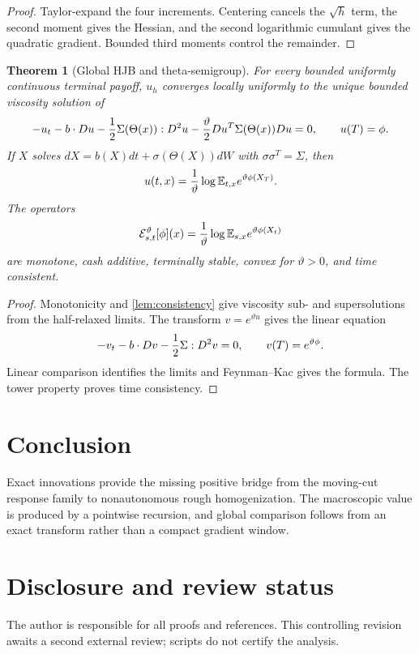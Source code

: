 \documentclass[11pt,reqno]{amsart}
\newtheorem{theorem}{Theorem}[section]
\theoremstyle{definition}
\theoremstyle{remark}
\newcommand{\E}{\mathbb E}
\newcommand{\cE}{\mathcal E}
\begin{document}
\begin{proof}
Taylor-expand the four increments.  Centering cancels the $\sqrt h$ term, the
second moment gives the Hessian, and the second logarithmic cumulant gives the
quadratic gradient.  Bounded third moments control the remainder.
\end{proof}

\begin{theorem}[Global HJB and theta-semigroup]\label{thm:HJB}
For every bounded uniformly continuous terminal payoff, $u_h$ converges
locally uniformly to the unique bounded viscosity solution of
\[
 -u_t-b\cdot Du-{1\over2}\Sigma(\Theta(x)):D^2u
 -{\vartheta\over2}Du^T\Sigma(\Theta(x))Du=0,
 \qquad u(T)=\phi.
\]
If $X$ solves
$dX=b(X)dt+\sigma(\Theta(X))dW$ with $\sigma\sigma^T=\Sigma$, then
\[
 u(t,x)={1\over\vartheta}
 \log\E_{t,x}e^{\vartheta\phi(X_T)}.
\]
The operators
\[
 \cE_{s,t}^{\vartheta}[\phi](x)
 ={1\over\vartheta}\log\E_{s,x}e^{\vartheta\phi(X_t)}
\]
are monotone, cash additive, terminally stable, convex for $\vartheta>0$, and
time consistent.
\end{theorem}

\begin{proof}
Monotonicity and \cref{lem:consistency} give viscosity sub- and supersolutions
from the half-relaxed limits.  The transform $v=e^{\vartheta u}$ gives the
linear equation
\[
 -v_t-b\cdot Dv-{1\over2}\Sigma:D^2v=0,
 \qquad v(T)=e^{\vartheta\phi}.
\]
Linear comparison identifies the limits and Feynman--Kac gives the formula.
The tower property proves time consistency.
\end{proof}

\section{Conclusion}
Exact innovations provide the missing positive bridge from the moving-cut
response family to nonautonomous rough homogenization.  The macroscopic value
is produced by a pointwise recursion, and global comparison follows from an
exact transform rather than a compact gradient window.

\section*{Disclosure and review status}
The author is responsible for all proofs and references.  This controlling
revision awaits a second external review; scripts do not certify the analysis.



\end{document}
